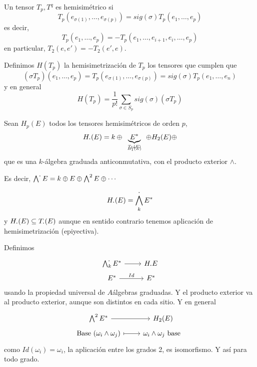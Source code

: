 \begin{ejem}
    Un tensor $T_p, T^q$ es hemisim\'etrico si 
    $$T_p(e_{\sigma(1)}, \ldots, e_{\sigma(p)}) = sig (\sigma) T_p(e_1, \ldots, e_p)$$
    es decir, 
    $$T_p(e_1, \ldots, e_p) = - T_p(e_1, \ldots, e_{i+1}, e_i, \ldots, e_p)$$
    en particular, $T_2(e,e') = -T_2(e',e)$. 

    Definimos $H(T_p)$ la hemisimetrizaci\'on de $T_p$ los tensores que cumplen que
    $$(\sigma T_p)(e_1, \ldots, e_p) = T_p(e_{\sigma(1)}, \ldots, e_{\sigma(p)}) = sig(\sigma) T_p (e_1,\ldots, e_n)$$
    y en general
    $$H(T_p) = \frac{1}{p!} \sum_{\sigma\in S_p} sig(\sigma) (\sigma T_p)$$
    

    Sean $H_p(E)$ todos los tensores hemisim\'etricos de orden $p$, 
    $$H_{\boldsymbol{\cdot}}(E) = k \oplus \underbrace{E^*}_{\tiny \begin{array}{c}
    T_1(E) \\[-1.5mm] = \\[-1.5mm] H_1(E)
    \end{array}} \oplus H_2(E) \oplus  $$
    que es una $k$-\'algebra graduada anticonmutativa, con el producto exterior $\wedge$. 

    Es decir, $\bigwedge^{\boldsymbol{\cdot}} E = k \oplus E \oplus \bigwedge^2 E \oplus \cdots$
\end{ejem}
\begin{teo}
    $$H_{\boldsymbol{\cdot}}(E) = \bigwedge^{\boldsymbol{\cdot}}_k E^*$$
    y $H_{\boldsymbol{\cdot}}(E) \subseteq T_{\boldsymbol{\cdot}}(E)$ aunque en sentido contrario tenemos aplicaci\'on de hemisimetrizaci\'on (epiyectiva).
\end{teo}
\begin{dem}
    Definimos 
    $$\bt \bigwedge^{\bdot}_k  E^* \arrow{r} & H_{\bdot} E  \\[-5mm] E^* \arrow{r}{Id} & E^*  \et$$
    usando la propiedad universal de $A$\'algebras graduadas. Y el producto exterior va al producto exterior, aunque son distintos en cada sitio. Y en general
    $$\bt \bigwedge^2 E^* \arrow{r} & H_2(E) \\[-5mm] \text{Base } (\omega_i \wedge \omega_j) \arrow[mapsto]{r} & \omega_i \wedge \omega_j \text{ base } \et$$
    como $Id(\omega_i) = \omega_i$, la aplicaci\'on entre los grados 2, es isomorfismo. Y as\'i para todo grado.
\end{dem}



